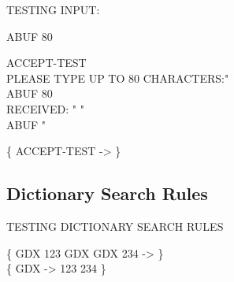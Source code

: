 \begin{tt}
TESTING INPUT: 

 ABUF 80  

\word{:} ACCEPT-TEST \\
\tab {}  PLEASE TYPE UP TO 80 CHARACTERS:"  \\
\tab ABUF 80  \\
\tab {}  RECEIVED: " \word{[CHAR]} "  \\
\tab ABUF   \word{[CHAR]} "   \\
\word{;}

\{ ACCEPT-TEST -> \}
\end{tt}

\subsection{Dictionary Search Rules}

\begin{tt}
TESTING DICTIONARY SEARCH RULES

\{ \word{:} GDX   123 \word{;} \tab \word{:} GDX   GDX 234 \word{;} -> \} \\
\{ GDX -> 123 234 \}
\end{tt}
